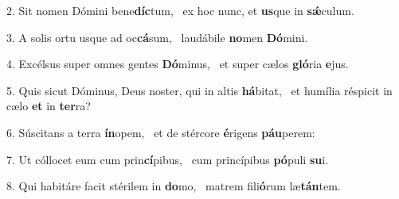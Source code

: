 2. Sit nomen Dómini bene\textbf{díc}tum, \ast\  ex hoc nunc, et \textbf{us}que in \textbf{sǽ}culum.\

3. A solis ortu usque ad oc\textbf{cá}sum, \ast\  laudábile \textbf{no}men \textbf{Dó}mini.\

4. Excélsus super omnes gentes \textbf{Dó}minus, \ast\  et super cælos \textbf{gló}ria \textbf{e}jus.\

5. Quis sicut Dóminus, Deus noster, qui in altis \textbf{há}bitat, \ast\  et humília réspicit in cælo \textbf{et} in \textbf{ter}ra?\

6. Súscitans a terra \textbf{ín}opem, \ast\  et de stércore \textbf{é}rigens \textbf{páu}perem:\

7. Ut cóllocet eum cum prin\textbf{cí}pibus, \ast\  cum princípibus \textbf{pó}puli \textbf{su}i.\

8. Qui habitáre facit stérilem in \textbf{do}mo, \ast\  matrem fili\textbf{ó}rum læ\textbf{tán}tem.\


